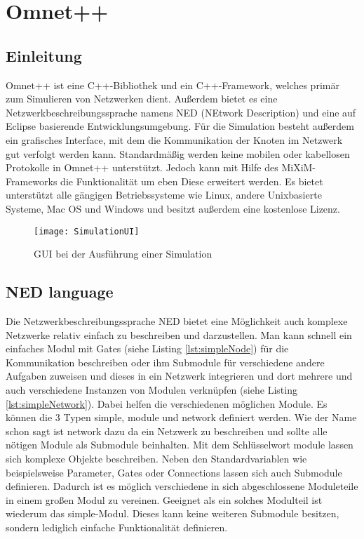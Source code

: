 \section{Omnet++}

\subsection{Einleitung}

Omnet++\cite{omnet} ist eine C++-Bibliothek und ein C++-Framework, welches primär zum Simulieren von Netzwerken dient. Außerdem bietet es eine Netzwerkbeschreibungssprache namens NED (NEtwork Description) und eine auf Eclipse\cite{eclipse} basierende Entwicklungsumgebung. Für die Simulation besteht außerdem ein grafisches Interface, mit dem die Kommunikation der Knoten im Netzwerk gut verfolgt werden kann.
\newline Standardmäßig werden keine mobilen oder kabellosen Protokolle in Omnet++ unterstützt. Jedoch kann mit Hilfe des MiXiM-Frameworks die Funktionalität um eben Diese erweitert werden.
\newline Es bietet unterstützt alle gängigen Betriebssysteme wie Linux, andere Unixbasierte Systeme, Mac OS und Windows und besitzt außerdem eine kostenlose Lizenz.

\begin{figure}[htbp]
\centering
\caption{GUI bei der Ausführung einer Simulation }
\label{fig:messageEvent}
\texttt{[image: SimulationUI]}
\end{figure}

\subsection{NED language}

Die Netzwerkbeschreibungssprache NED\cite{ned} bietet eine Möglichkeit auch komplexe Netzwerke relativ einfach zu beschreiben und darzustellen. Man kann schnell ein einfaches Modul mit Gates (siehe Listing \ref{lst:simpleNode}) für die Kommunikation beschreiben oder ihm Submodule für verschiedene andere Aufgaben zuweisen und dieses in ein Netzwerk integrieren und dort mehrere und auch verschiedene Instanzen von Modulen verknüpfen (siehe Listing \ref{lst:simpleNetwork}). 
\newline
Dabei helfen die verschiedenen möglichen Module. Es können die 3 Typen simple, module und network definiert werden. Wie der Name schon sagt ist network dazu da ein Netzwerk zu beschreiben und sollte alle nötigen Module als Submodule beinhalten.
\newline
Mit dem Schlüsselwort module lassen sich komplexe Objekte beschreiben. Neben den Standardvariablen wie beispielsweise Parameter, Gates oder Connections lassen sich auch Submodule definieren. Dadurch ist es möglich verschiedene in sich abgeschlossene Moduleteile in einem großen Modul zu vereinen.
\newline
Geeignet als ein solches Modulteil ist wiederum das simple-Modul. Dieses kann keine weiteren Submodule besitzen, sondern lediglich einfache Funktionalität definieren.

